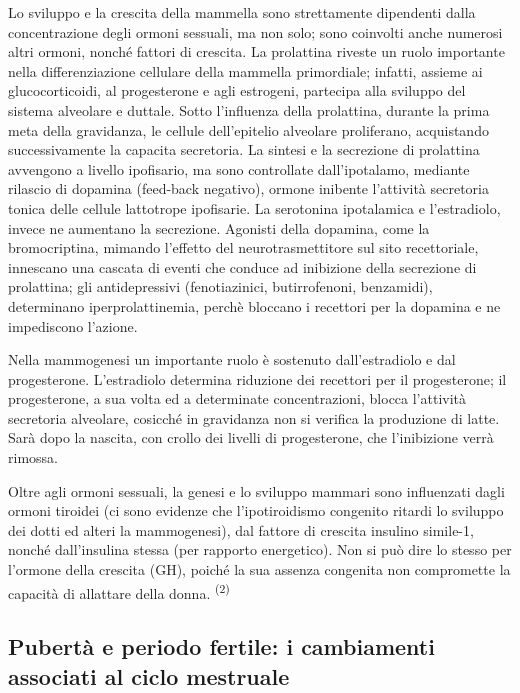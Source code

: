 \documentclass[]{article}
\begin{document}
Lo sviluppo e la crescita della mammella sono strettamente dipendenti
dalla concentrazione degli ormoni sessuali, ma non solo; sono coinvolti
anche numerosi altri ormoni, nonché fattori di crescita. La prolattina
riveste un ruolo importante nella differenziazione cellulare della
mammella primordiale; infatti, assieme ai glucocorticoidi, al
progesterone e agli estrogeni, partecipa alla sviluppo del sistema
alveolare e duttale. Sotto l'influenza della prolattina, durante la
prima meta della gravidanza, le cellule dell'epitelio alveolare
proliferano, acquistando successivamente la capacita secretoria. La
sintesi e la secrezione di prolattina avvengono a livello ipofisario, ma
sono controllate dall'ipotalamo, mediante rilascio di dopamina
(feed-back negativo), ormone inibente l'attività secretoria tonica delle
cellule lattotrope ipofisarie. La serotonina ipotalamica e l'estradiolo,
invece ne aumentano la secrezione. Agonisti della dopamina, come la
bromocriptina, mimando l'effetto del neurotrasmettitore sul sito
recettoriale, innescano una cascata di eventi che conduce ad inibizione
della secrezione di prolattina; gli antidepressivi (fenotiazinici,
butirrofenoni, benzamidi), determinano iperprolattinemia, perchè
bloccano i recettori per la dopamina e ne impediscono l'azione.

Nella mammogenesi un importante ruolo è sostenuto dall'estradiolo e dal
progesterone. L'estradiolo determina riduzione dei recettori per il
progesterone; il progesterone, a sua volta ed a determinate
concentrazioni, blocca l'attività secretoria alveolare, cosicché in
gravidanza non si verifica la produzione di latte. Sarà dopo la nascita,
con crollo dei livelli di progesterone, che l'inibizione verrà rimossa.

Oltre agli ormoni sessuali, la genesi e lo sviluppo mammari sono
influenzati dagli ormoni tiroidei (ci sono evidenze che l'ipotiroidismo
congenito ritardi lo sviluppo dei dotti ed alteri la mammogenesi), dal
fattore di crescita insulino simile-1, nonché dall'insulina stessa (per
rapporto energetico). Non si può dire lo stesso per l'ormone della
crescita (GH), poiché la sua assenza congenita non compromette la
capacità di allattare della donna. \textsuperscript{(2) }

\hypertarget{pubertuxe0-e-periodo-fertile-i-cambiamenti-associati-al-ciclo-mestruale}{%
\subsection{Pubertà e periodo fertile: i cambiamenti associati al ciclo
mestruale}\label{pubertuxe0-e-periodo-fertile-i-cambiamenti-associati-al-ciclo-mestruale}}
\end{document}
